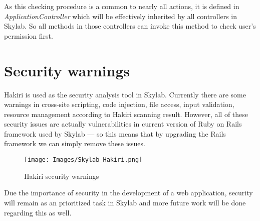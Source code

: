 As this checking procedure is a common to nearly all actions, it is defined in \textit{ApplicationController} which will be effectively inherited by all controllers in Skylab. So all methods in those controllers can invoke this method to check user's permission first.

\section{Security warnings}

Hakiri is used as the security analysis tool in Skylab. Currently there are some warnings in cross-site scripting, code injection, file access, input validation, resource management according to Hakiri scanning result. However, all of these security issues are actually vulnerabilities in current version of Ruby on Rails framework used by Skylab --- so this means that by upgrading the Rails framework we can simply remove these issues.

\begin{figure}[h]
	\centering
	\texttt{[image: Images/Skylab\_Hakiri.png]}
	\caption{Hakiri security warnings}
	\label{fig:SkylabHakiri}
\end{figure}

Due the importance of security in the development of a web application, security will remain as an prioritized task in Skylab and more future work will be done regarding this as well.
